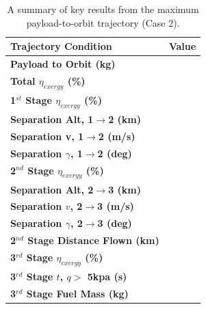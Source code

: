 \begin{table}[ht]%
	\centering
\begin{tabular}{l c } 
	\hline \textbf{Trajectory Condition}
	& Value
	\\
	\hline \textbf{Payload to Orbit (kg)}
	& \textbf{\PayloadToOrbitStandardNoReturn}
	\\
	\textbf{Total $\eta_{exergy}$ (\%)}
	& \textbf{\totalExergyEffStandardNoReturn}
	\\
	\hline 
	\textbf{1$^{st}$ Stage $\eta_{exergy}$ (\%)}
	& \textbf{\firstExergyEffStandardNoReturn}
	\\

	\textbf{Separation Alt, 1$\rightarrow$2 (km)}
	& \firstsecondSeparationAltStandardNoReturn
	\\
	\textbf{Separation v, 1$\rightarrow$2 (m/s)}
	& \firstsecondSeparationvStandardNoReturn
	\\
	\textbf{Separation $\gamma$, 1$\rightarrow$2 (deg)}
	& \firstsecondSeparationgammaStandardNoReturn
	\\
	\hline 
	\textbf{2$^{nd}$ Stage $\eta_{exergy}$ (\%)}
	& \textbf{\secondExergyEffStandardNoReturn}
	\\

	\textbf{Separation Alt, 2$\rightarrow$3 (km)}
	& \secondthirdSeparationAltStandardNoReturn
	\\
	\textbf{Separation $v$, 2$\rightarrow$3 (m/s)}
	& \secondthirdSeparationvStandardNoReturn
	\\
	\textbf{Separation $\gamma$, 2$\rightarrow$3 (deg)}
	& \secondthirdSeparationgammaStandardNoReturn
	\\
	\textbf{2$^{nd}$ Stage Distance Flown (km)}
	& \SecondDistStandardNoReturn
	\\
	\hline 
	\textbf{3$^{rd}$ Stage $\eta_{exergy}$ (\%)}
	& \textbf{\thirddExergyEffStandardNoReturn}
	\\

	\textbf{3$^{rd}$ Stage $t$, $q >$ 5kpa (s)}
	& \thirdqOverFiveStandardNoReturn
	\\
	\textbf{3$^{rd}$ Stage Fuel Mass (kg)}
	& \thirdmFuelStandardNoReturn
	\\
	\hline 
\end{tabular} 
	\caption{A summary of key results from the maximum payload-to-orbit trajectory (Case 2).}
	\label{tab:summaryStandardNoReturn}
\end{table}







